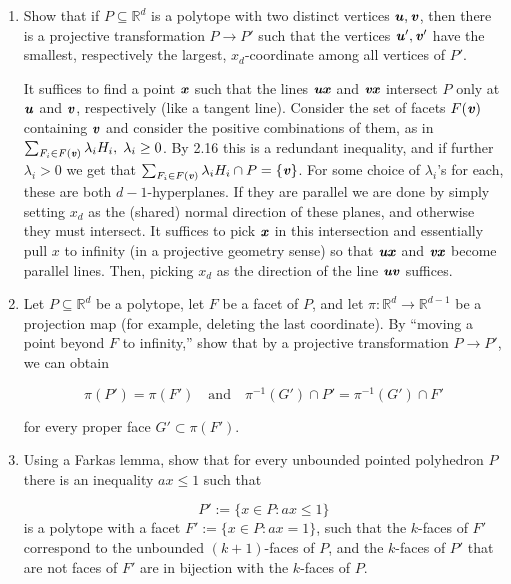 \documentclass{article}
\begin{document}
\begin{enumerate}
\item Show that if $P \subseteq \mathbb{R}^d$ is a polytope with two distinct vertices $\textbf{\textit{u}}, \textbf{\textit{v}}$, then there is a projective transformation $P \longrightarrow P'$ such that the vertices $\textbf{\textit{u}}', \textbf{\textit{v}}'$ have the smallest, respectively the largest, $x_d$-coordinate among all vertices of $P'$.

\begin{solution}
    It suffices to find a point $\textbf{\textit{x}}$ such that the lines $\textbf{\textit{ux}}$ and $\textbf{\textit{vx}}$ intersect $P$ only at $\textbf{\textit{u}}$ and $\textbf{\textit{v}}$, respectively (like a tangent line). Consider the set of facets $F(\textbf{\textit{v}})$ containing $\textbf{\textit{v}}$ and consider the positive combinations of them, as in $\sum_{F_i \in F(\textbf{\textit{v}})} \lambda_iH_i, \; \lambda_i \geq 0$. By 2.16 this is a redundant inequality, and if further $\lambda_i > 0$ we get that $\sum_{F_i \in F(\textbf{\textit{v}})} \lambda_iH_i \cap P = \{\textbf{\textit{v}}\}$. For some choice of $\lambda_i$'s for each, these are both $d-1$-hyperplanes. If they are parallel we are done by simply setting $x_d$ as the (shared) normal direction of these planes, and otherwise they must intersect. It suffices to pick $\textbf{\textit{x}}$ in this intersection and essentially pull $x$ to infinity (in a projective geometry sense) so that $\textbf{\textit{ux}}$ and $\textbf{\textit{vx}}$ become parallel lines. Then, picking $x_d$ as the direction of the line $\textbf{\textit{uv}}$ suffices. 
\end{solution}


\item Let $P \subseteq \mathbb{R}^d$ be a polytope, let $F$ be a facet of $P$, and let $\pi : \mathbb{R}^d \longrightarrow \mathbb{R}^{d-1}$ be a projection map (for example, deleting the last coordinate). By “moving a point beyond $F$ to infinity,” show that by a projective transformation $P \longrightarrow P'$, we can obtain

\[ \pi(P') = \pi(F') \quad\text{and}\quad \pi^{-1}(G') \cap P' = \pi^{-1}(G') \cap F' \]

for every proper face $G' \subset \pi(F')$.

\item Using a Farkas lemma, show that for every unbounded pointed polyhedron $P$ there is an inequality $ax \le 1$ such that

\[P' := \{x \in P : ax \le 1\}\]
is a polytope with a facet $F' := \{x \in P : ax = 1\}$, such that the $k$-faces of $F'$ correspond to the unbounded $(k+1)$-faces of $P$, and the $k$-faces of $P'$ that are not faces of $F'$ are in bijection with the $k$-faces of $P$.


\end{enumerate}
\end{document}
